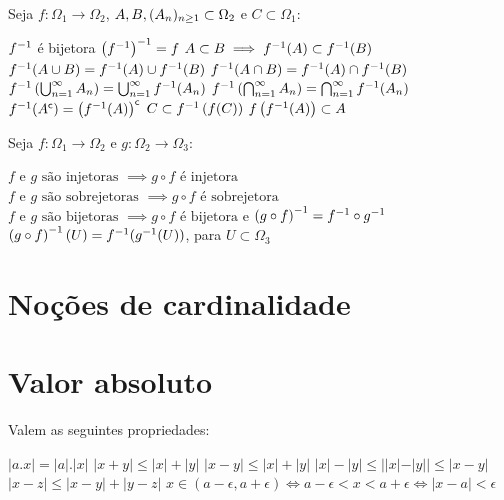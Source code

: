 \begin{theorem} Seja \( f\colon\Omega_1 \to \Omega_2 \),  \(\mathmbox{A,B,(A_n)_{n\geq1} \subset \Omega_2}\) e \(C \subset \Omega_1\):
	\begin{outline}[enumerate]
		\1 $f^{-1}$ é bijetora
		\1 $\left(f^{-1}\right)^{-1} = f$
		\1 \(A \subset B \implies f^{-1}(A) \subset f^{-1}(B)\) 
		\1 \( f^{-1}(A\cup B) = f^{-1}(A)\cup f^{-1}(B) \)
		\1 \( f^{-1}(A\cap B) = f^{-1}(A)\cap f^{-1}(B) \)
		\1 \(f^{-1}\left( \bigcup_{n=1}^\infty A_n \right) = \bigcup_{n=1}^\infty f^{-1}(A_n) \)
		\1 \(f^{-1}\left( \bigcap_{n=1}^\infty A_n \right) = \bigcap_{n=1}^\infty f^{-1}(A_n) \)
		\1 \(f^{-1}(A^\mathsf{c}) = \left(f^{-1}(A)\right)^\mathsf{c} \)
		\1 \( C \subset f^{-1} \left( f(C) \right) \)
		\1 \(f\left(f^{-1}(A)\right) \subset A \)
	\end{outline}
\end{theorem}

\begin{theorem} Seja $f\colon\Omega_1 \to \Omega_2$ e $g\colon\Omega_2 \to \Omega_3$:
	\begin{outline}[enumerate]
		\1 \( f \text{ e } g \text{ são injetoras } \implies g\circ f \text{ é injetora} \)
		\1 \( f \text{ e } g \text{ são sobrejetoras } \implies g\circ f \text{ é sobrejetora} \)
		\1 \( f \text{ e } g \text{ são bijetoras } \implies g\circ f \text{ é bijetora} \) e \( \left(g \circ f\right)^{-1} = f^{-1}\circ g^{-1}\)
		\1 \( \left(g \circ f\right)^{-1}(U) = f^{-1}(g^{-1}(U))\), para $U\subset \Omega_3$
	\end{outline}
\end{theorem}

\section{Noções de cardinalidade}

\section{Valor absoluto}

\begin{theorem}
	Valem as seguintes propriedades:
	\begin{outline}[enumerate]
		\1 \( |a.x| = |a|.|x| \)
		\1 \( |x+y| \leq |x|+|y| \)
		\1 \( |x-y| \leq |x|+|y| \)
		\1 \( |x|-|y| \leq ||x|-|y|| \leq |x-y| \)
		\1 \( |x-z| \leq |x-y| + |y-z| \)
		\1 \( x \in (a-\epsilon, a+\epsilon) \iff a-\epsilon < x < a+\epsilon \iff |x-a|<\epsilon \)
	\end{outline}
\end{theorem}

